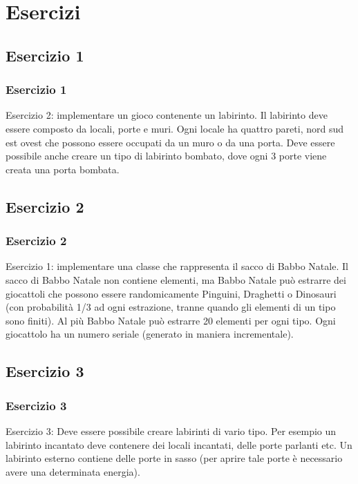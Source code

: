 \documentclass{beamer}
\begin{document}
\section{Esercizi}

\subsection{Esercizio 1}

\begin{frame}
\frametitle{Esercizio 1}
\begin{framed}
Esercizio 2: implementare un gioco contenente un labirinto. Il labirinto deve essere composto da locali, porte e muri. Ogni locale ha quattro pareti, nord sud est ovest che possono essere occupati da un muro o da una porta. Deve essere possibile anche creare un tipo di labirinto bombato, dove ogni 3 porte viene creata una porta bombata.
\end{framed}
\end{frame}

\subsection{Esercizio 2}
\begin{frame}
\frametitle{Esercizio 2}
\begin{framed}
Esercizio 1: implementare una classe che rappresenta il sacco di Babbo Natale. Il sacco di Babbo Natale non contiene elementi, ma Babbo Natale pu\`o estrarre dei giocattoli che possono essere randomicamente  Pinguini, Draghetti o Dinosauri (con probabilit\`a 1/3 ad ogni estrazione, tranne quando gli elementi di un tipo sono finiti). Al pi\`u Babbo Natale pu\`o estrarre 20 elementi per ogni tipo. Ogni giocattolo ha un numero seriale (generato in maniera incrementale).
\end{framed}
\end{frame}



\subsection{Esercizio 3}
\begin{frame}
\frametitle{Esercizio 3}
\begin{framed}
Esercizio 3: Deve essere possibile creare labirinti di vario tipo. Per esempio un labirinto incantato deve contenere dei locali incantati, delle porte parlanti etc. Un labirinto esterno contiene delle porte in sasso (per aprire tale porte \`e necessario avere una determinata energia).
\end{framed}
\end{frame}
\end{document}
